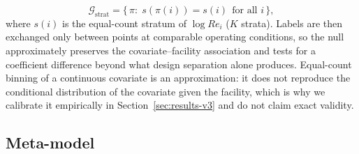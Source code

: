 \documentclass[journal=dce]{CUP-JNL-DTM}%
\begin{document}
\begin{itemize}
\begin{equation}
\mathcal{G}_{\mathrm{strat}}=\bigl\{\,\pi:\;s(\pi(i))=s(i)\ \ \text{for all } i\,\bigr\},
\label{eq:strat}
\end{equation}
where $s(i)$ is the equal-count stratum of $\log Re_i$ ($K$ strata). Labels are then exchanged only between points at comparable operating conditions, so the null approximately preserves the covariate--facility association and tests for a coefficient difference beyond what design separation alone produces. Equal-count binning of a continuous covariate is an approximation: it does not reproduce the conditional distribution of the covariate given the facility, which is why we calibrate it empirically in Section~\ref{sec:results-v3} and do not claim exact validity.
\end{itemize}

\subsection{Meta-model}
\end{document}
